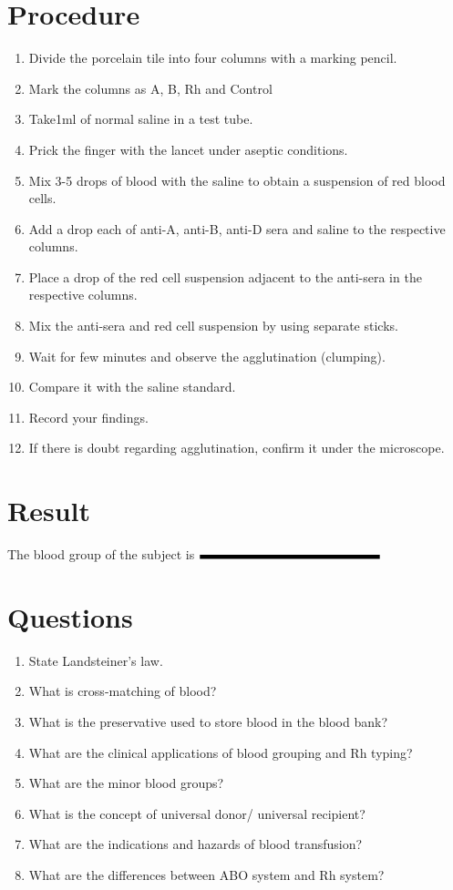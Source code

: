 \documentclass[a4paper,12pt]{book}
\begin{document}
									\section*{Procedure}
									\begin{enumerate}
										\item{Divide the porcelain tile into four columns with a marking pencil.}
										\item{Mark the columns as A, B, Rh and Control}
										\item{Take1ml of normal saline in a test tube.}
										\item{Prick the finger with the lancet under aseptic conditions.}
										\item{Mix 3-5 drops of blood with the saline to obtain a suspension of red blood cells.}
										\item{Add a drop each of anti-A, anti-B, anti-D sera and saline to the respective columns.}
										\item{Place a drop of the red cell suspension adjacent to the anti-sera in the respective columns.}
										\item{Mix the anti-sera and red cell suspension by using separate sticks.}
										\item{Wait for few minutes and observe the agglutination (clumping).}
										\item{Compare it with the saline standard.}
										\item{Record your findings.}
										\item{If there is doubt regarding agglutination, confirm it under the microscope.}
									\end{enumerate}
									\section*{Result}
									The blood group of the subject is $\rule{5cm}{0.1cm}$
									\section*{Questions}
									\begin{enumerate}
										\item{State Landsteiner’s law.}
										\item{What is cross-matching of blood?}
										\item{What is the preservative used to store blood in the blood bank?}
										\item{What are the clinical applications of blood grouping and Rh typing?}
										\item{What are the minor blood groups?}
										\item{What is the concept of universal donor/ universal recipient?}
										\item{What are the indications and hazards of blood transfusion?}
										\item{What are the differences between ABO system and Rh system?}
									\end{enumerate}
\end{document}

